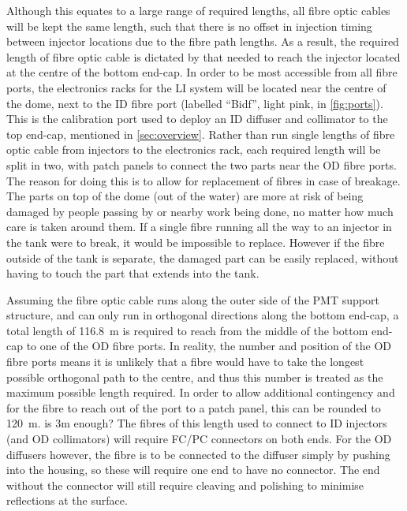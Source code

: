 \documentclass[a4paper,11pt]{article}
\begin{document}
Although this equates to a large range of required lengths, all fibre optic cables will be kept the same length, such that there is no offset in injection timing between injector locations due to the fibre path lengths. As a result, the required length of fibre optic cable is dictated by that needed to reach the injector located at the centre of the bottom end-cap. In order to be most accessible from all fibre ports, the electronics racks for the LI system will be located near the centre of the dome, next to the ID fibre port (labelled ``Bidf'', light pink, in \cref{fig:ports}). This is the calibration port used to deploy an ID diffuser and collimator to the top end-cap, mentioned in \cref{sec:overview}. Rather than run single lengths of fibre optic cable from injectors to the electronics rack, each required length will be split in two, with patch panels to connect the two parts near the OD fibre ports. The reason for doing this is to allow for replacement of fibres in case of breakage. The parts on top of the dome (out of the water) are more at risk of being damaged by people passing by or nearby work being done, no matter how much care is taken around them. If a single fibre running all the way to an injector in the tank were to break, it would be impossible to replace. However if the fibre outside of the tank is separate, the damaged part can be easily replaced, without having to touch the part that extends into the tank.

Assuming the fibre optic cable runs along the outer side of the PMT support structure, and can only run in orthogonal directions along the bottom end-cap, a total length of 116.8~m is required to reach from the middle of the bottom end-cap to one of the OD fibre ports. In reality, the number and position of the OD fibre ports means it is unlikely that a fibre would have to take the longest possible orthogonal path to the centre, and thus this number is treated as the maximum possible length required. In order to allow additional contingency and for the fibre to reach out of the port to a patch panel, this can be rounded to 120~m. {\color{red} is 3m enough?} The fibres of this length used to connect to ID injectors (and OD collimators) will require FC/PC connectors on both ends. For the OD diffusers however, the fibre is to be connected to the diffuser simply by pushing into the housing, so these will require one end to have no connector. The end without the connector will still require cleaving and polishing to minimise reflections at the surface.
\end{document}
